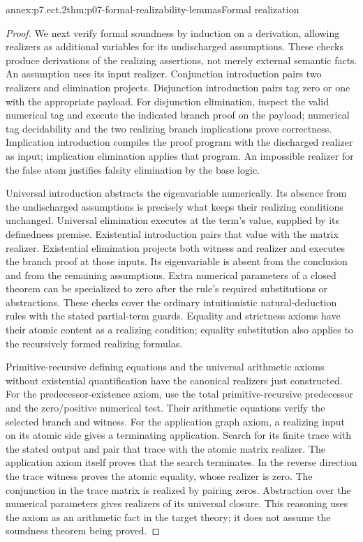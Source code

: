 \begin{annexitem}{annex:p7.ect.2}{thm:p07-formal-realizability-lemmas}{Formal realization}
\begin{proof}
We next verify formal soundness by induction on a derivation, allowing
realizers as additional variables for its undischarged assumptions.
These checks produce derivations of the realizing assertions, not
merely external semantic facts. An assumption uses its input realizer.
Conjunction introduction pairs two realizers and elimination projects.
Disjunction introduction pairs tag zero or one with the appropriate
payload. For disjunction elimination, inspect the valid numerical
tag and execute the indicated branch proof on the payload; numerical
tag decidability and the two realizing branch implications prove
correctness. Implication introduction compiles the proof program
with the discharged realizer as input; implication elimination applies
that program. An impossible realizer for the false atom justifies
falsity elimination by the base logic.

Universal introduction abstracts the eigenvariable numerically.
Its absence from the undischarged assumptions is precisely what
keeps their realizing conditions unchanged. Universal elimination
executes at the term's value, supplied by its definedness premise.
Existential introduction pairs that value with the matrix realizer.
Existential elimination projects both witness and realizer and executes
the branch proof at those inputs. Its eigenvariable is absent from
the conclusion and from the remaining assumptions. Extra numerical
parameters of a closed theorem can be specialized to zero after the
rule's required substitutions or abstractions. These checks cover
the ordinary intuitionistic natural-deduction rules with the stated
partial-term guards. Equality and strictness axioms have their atomic
content as a realizing condition; equality substitution also applies
to the recursively formed realizing formulas.

Primitive-recursive defining equations and the universal arithmetic
axioms without existential quantification have the canonical realizers
just constructed. For the predecessor-existence axiom, use the total
primitive-recursive predecessor and the zero/positive numerical test.
Their arithmetic equations verify the selected branch and witness.
For the application graph axiom, a realizing input on its atomic side
gives a terminating application. Search for its finite trace with the
stated output and pair that trace with the atomic matrix realizer.
The application axiom itself proves that the search terminates.
In the reverse direction the trace witness proves the atomic equality,
whose realizer is zero. The conjunction in the trace matrix is
realized by pairing zeros. Abstraction over the numerical parameters
gives realizers of its universal closure. This reasoning uses the
axiom as an arithmetic fact in the target theory; it does not assume
the soundness theorem being proved.


\end{proof}
\end{annexitem}
